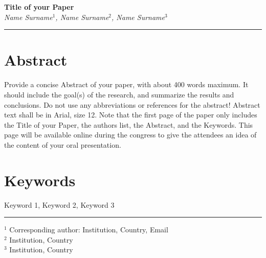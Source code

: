 \documentclass[10pt]{article}
\begin{document}
\begin{center}
    \vspace*{1cm}
    \LARGE \textbf{Title of your Paper}\\[1em]
    \large \textit{Name Surname$^1$, Name Surname$^2$, Name Surname$^3$}
\end{center}

\vspace{1em}
\noindent\rule{\textwidth}{0.4pt}

{
\fontsize{12pt}{14pt}\selectfont

\section*{Abstract}

Provide a concise Abstract of your paper, with about 400 words maximum. It should include the goal(s) of the research, and summarize the results and conclusions. Do not use any abbreviations or references for the abstract! Abstract text shall be in Arial, size 12. Note that the first page of the paper only includes the Title of your Paper, the authors list, the Abstract, and the Keywords. This page will be available online during the congress to give the attendees an idea of the content of your oral presentation.

\section*{Keywords}

Keyword 1, Keyword 2, Keyword 3

} %

\vspace*{\fill}
\noindent\rule{0.35\textwidth}{0.4pt}

\vspace{1em}
\noindent
$^1$ Corresponding author: Institution, Country, Email\\
$^2$ Institution, Country\\
$^3$ Institution, Country

\newpage
\end{document}
